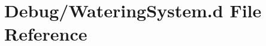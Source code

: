\hypertarget{_watering_system_8d}{}\section{Debug/\+Watering\+System.d File Reference}
\label{_watering_system_8d}
